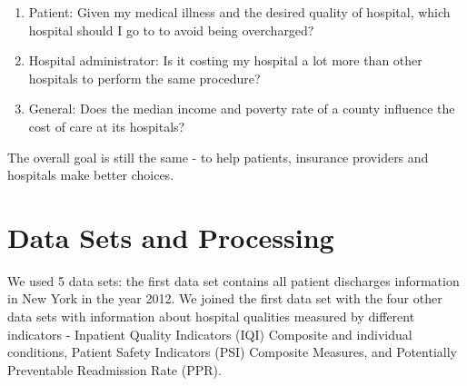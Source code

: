 \documentclass[letterpaper,11pt]{article}
\begin{document}
\begin{enumerate}
  \item Patient: Given my medical illness and the desired quality of hospital, which hospital should I go to to avoid being overcharged? 
  \item Hospital administrator: Is it costing my hospital a lot more than other hospitals to perform the same procedure?
  \item General: Does the median income and poverty rate of a county influence the cost of care at its hospitals?
\end{enumerate}
The overall goal is still the same - to help patients, insurance providers and hospitals make better choices. 

\section*{Data Sets and Processing}
We used 5 data sets: the first data set contains all patient discharges information in New York in the year 2012. We joined the first data set with the four other data sets with information about hospital qualities measured by different indicators - Inpatient Quality Indicators (IQI) Composite and individual conditions, Patient Safety Indicators (PSI) Composite Measures, and Potentially Preventable Readmission Rate (PPR). 
\end{document}
